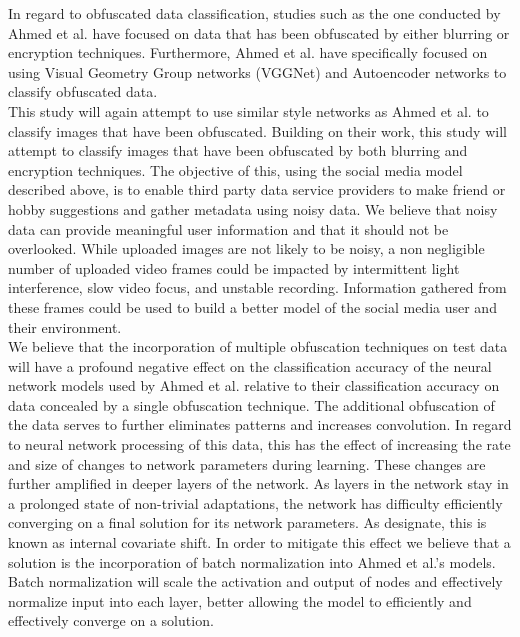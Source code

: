 \documentclass[12pt, titlepage]{article}
\begin{document}
\noindent In regard to obfuscated data classification, studies such as the one conducted by Ahmed et al. have focused on data that has been obfuscated by either blurring or encryption techniques. Furthermore, Ahmed et al. have specifically focused on using Visual Geometry Group networks (VGGNet) and Autoencoder networks to classify obfuscated data.\\ 

\noindent This study will again attempt to use similar style networks as Ahmed et al. to classify images that have been obfuscated. Building on their work, this study will attempt to classify images that have been obfuscated by both blurring and encryption techniques. The objective of this, using the social media model described above, is to enable third party data service providers to make friend or hobby suggestions and gather metadata using noisy data. We believe that noisy data can provide meaningful user information and that it should not be overlooked. While uploaded images are not likely to be noisy, a non negligible number of uploaded video frames could be impacted by intermittent light interference, slow video focus, and unstable recording. Information gathered from these frames could be used to build a better model of the social media user and their environment.\\ 

\noindent We believe that the incorporation of multiple obfuscation techniques on test data will have a profound negative effect on the classification accuracy of the neural network models used by Ahmed et al. relative to their classification accuracy on data concealed by a single obfuscation technique. The additional obfuscation of the data serves to further eliminates patterns and increases convolution. In regard to neural network processing of this data, this has the effect of increasing the rate and size of changes to network parameters during learning. These changes are further amplified in deeper layers of the network. As layers in the network stay in a prolonged state of non-trivial adaptations, the network has difficulty efficiently converging on a final solution for its network parameters. As \cite{ioffe2015batch} designate, this is known as internal covariate shift. In order to mitigate this effect we believe that a solution is the incorporation of batch normalization into Ahmed et al.'s models. Batch normalization will scale the activation and output of nodes and effectively normalize input into each layer, better allowing the model to efficiently and effectively converge on a solution.\\
\end{document}
